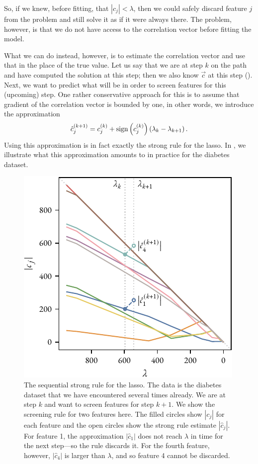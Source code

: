 So, if we knew, before fitting, that \(|c_j| < \lambda\), then we could safely discard feature \(j\) from the problem and still solve it as if it were always there. The problem, however, is that we do not have access to the correlation vector before fitting the model.

What we can do instead, however, is to estimate the correlation vector and use that in the place of the true value. Let us say that we are at step \(k\) on the path and have computed the solution at this step; then we also know \(\vec{c}\) at this step (). Next, we want to predict what  will be in order to screen features for this (upcoming) step. One rather conservative approach for this is to assume that gradient of the correlation vector is bounded by one, in other words, we introduce the approximation
\[
  \hat{c}_j^{(k+1)} = c_j^{(k)} + \operatorname{sign}\left(c_j^{(k)}\right)\left(\lambda_k - \lambda_{k+1}\right).
\]
Using this approximation is in fact exactly the strong rule for the lasso. In , we illustrate what this approximation amounts to in practice for the diabetes dataset.

\begin{figure}[htpb]
  \centering
  \includegraphics[]{figures/strong-rule.pdf}
  \caption{%
    The sequential strong rule for the lasso. The data is the diabetes dataset that we have encountered several times already. We are at step \(k\) and want to screen features for step \(k+1\). We show the screening rule for two features here. The filled circles show \(|c_j|\) for each feature and the open circles show the strong rule estimate \(|\hat{c}_j|\). For feature 1, the approximation \(|\hat{c}_1|\) does not reach \(\lambda\) in time for the next step---so the rule discards it. For the fourth feature, however, \(|\hat{c}_4|\) is larger than \(\lambda\), and so feature 4 cannot be discarded.
  }
  \label{fig:strong-rule}
\end{figure}


